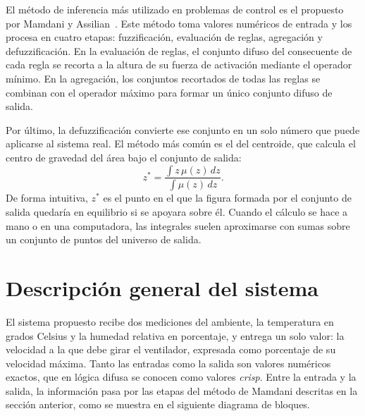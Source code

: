 \documentclass[11pt]{article}
\begin{document}
El método de inferencia más utilizado en problemas de control es el propuesto por Mamdani y Assilian~\cite{mamdani1975}. Este método toma valores numéricos de entrada y los procesa en cuatro etapas: fuzzificación, evaluación de reglas, agregación y defuzzificación. En la evaluación de reglas, el conjunto difuso del consecuente de cada regla se recorta a la altura de su fuerza de activación mediante el operador mínimo. En la agregación, los conjuntos recortados de todas las reglas se combinan con el operador máximo para formar un único conjunto difuso de salida.

Por último, la defuzzificación convierte ese conjunto en un solo número que puede aplicarse al sistema real. El método más común es el del centroide, que calcula el centro de gravedad del área bajo el conjunto de salida:
\[
z^{*} = \frac{\int z \, \mu(z) \, dz}{\int \mu(z) \, dz}.
\]
De forma intuitiva, $z^{*}$ es el punto en el que la figura formada por el conjunto de salida quedaría en equilibrio si se apoyara sobre él. Cuando el cálculo se hace a mano o en una computadora, las integrales suelen aproximarse con sumas sobre un conjunto de puntos del universo de salida.

\section{Descripción general del sistema}

El sistema propuesto recibe dos mediciones del ambiente, la temperatura en grados Celsius y la humedad relativa en porcentaje, y entrega un solo valor: la velocidad a la que debe girar el ventilador, expresada como porcentaje de su velocidad máxima. Tanto las entradas como la salida son valores numéricos exactos, que en lógica difusa se conocen como valores \emph{crisp}. Entre la entrada y la salida, la información pasa por las etapas del método de Mamdani descritas en la sección anterior, como se muestra en el siguiente diagrama de bloques.
\end{document}
